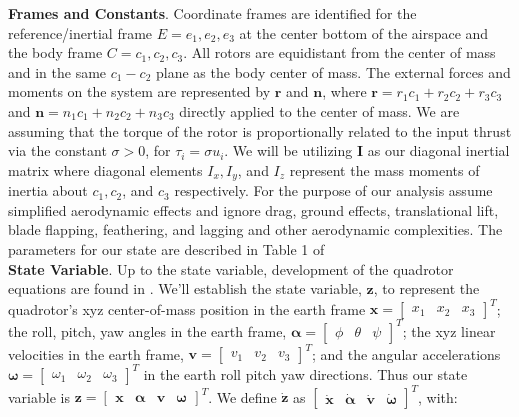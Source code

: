 \documentclass{article}
\begin{document}
\begin{multicols}{2}
\noindent \textbf{Frames and Constants}. Coordinate frames are identified for the reference/inertial frame $E={e_1, e_2, e_3}$ at the center bottom of the airspace and the 
body frame $C={c_1, c_2, c_3}$.  All rotors are equidistant from the center of mass and in the same $c_1-c_2 $ plane as the body 
center of mass.  The external forces and moments on the system are represented by $\boldsymbol{r}$ and $\boldsymbol{n}$, where 
$\boldsymbol{r} = r_1 c_1 + r_2 c_2 + r_3 c_3$ and $\boldsymbol{n} = n_1 c_1 + n_2 c_2 + n_3 c_3$ directly applied to the center 
of mass. We are assuming that the torque of the rotor is proportionally related to the input thrust via the constant $\sigma>0$, for $
\tau_i = \sigma u_i$. We will be utilizing $\boldsymbol{I}$ as our diagonal inertial matrix where diagonal elements  $I_x, I_y $, and 
$I_z$ represent the mass moments of inertia about $c_1, c_2 $, and $c_3$ respectively.  For the purpose of our analysis assume simplified aerodynamic effects and ignore 
 drag, ground effects, translational lift, blade flapping, feathering, and lagging and other aerodynamic complexities. The parameters for our state are described in Table 1 of \cite{FaalP}\\

\noindent \textbf{State Variable}.  Up to the state variable, development of the quadrotor equations are found in \cite{FaalD}.  We'll establish the state variable, $\mathbf{z}$, to represent the quadrotor's xyz center-of-mass position in the earth frame $\mathbf{x}=\begin{bmatrix}x_1 & x_2 & x_3\end{bmatrix}^T$; the roll, pitch, yaw angles in the earth frame, $\bm{\alpha} =\begin{bmatrix}\phi & \theta & \psi\end{bmatrix}^T$; the xyz linear velocities in the earth frame, $\mathbf{v}=\begin{bmatrix}v_1 & v_2 & v_3\end{bmatrix}^T$; and the angular accelerations $\bm{\omega}=\begin{bmatrix}\omega_1 & \omega_2 & \omega_3\end{bmatrix}^T$ in the earth roll pitch yaw directions. Thus our state variable is $\mathbf{z}=\begin{bmatrix}\mathbf{x} &\bm{\alpha}&\mathbf{v}&\bm{\omega}\end{bmatrix}^T$. We define $\boldsymbol{\dot{z}}$ as $\begin{bmatrix} \mathbf{\dot{x}} &\bm{\dot{\alpha}}&\mathbf{\dot{v}}&\bm{\dot{\omega}} \end{bmatrix}^T$, with:


\end{multicols}
\end{document}
